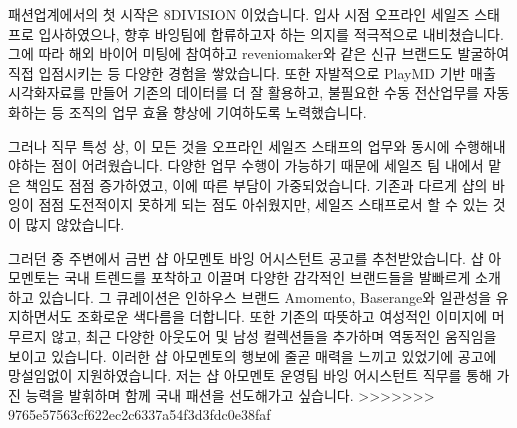 \documentclass[a4paper,10pt]{extarticle}
\begin{document}
패션업계에서의 첫 시작은 8DIVISION 이었습니다. 입사 시점 오프라인 세일즈 스태프로 입사하였으나, 향후 바잉팀에 합류하고자 하는 의지를 적극적으로 내비쳤습니다. 그에 따라 해외 바이어 미팅에 참여하고 reveniomaker와 같은 신규 브랜드도 발굴하여 직접 입점시키는 등 다양한 경험을 쌓았습니다. 또한 자발적으로 PlayMD 기반 매출 시각화자료를 만들어 기존의 데이터를 더 잘 활용하고, 불필요한 수동 전산업무를 자동화하는 등 조직의 업무 효율 향상에 기여하도록 노력했습니다.

그러나 직무 특성 상, 이 모든 것을 오프라인 세일즈 스태프의 업무와 동시에 수행해내야하는 점이 어려웠습니다. 다양한 업무 수행이 가능하기 때문에 세일즈 팀 내에서 맡은 책임도 점점 증가하였고, 이에 따른 부담이 가중되었습니다. 기존과 다르게 샵의 바잉이 점점 도전적이지 못하게 되는 점도 아쉬웠지만, 세일즈 스태프로서 할 수 있는 것이 많지 않았습니다.

그러던 중 주변에서 금번 샵 아모멘토 바잉 어시스턴트 공고를 추천받았습니다. 샵 아모멘토는 국내 트렌드를 포착하고 이끌며 다양한 감각적인 브랜드들을 발빠르게 소개하고 있습니다. 그 큐레이션은 인하우스 브랜드 Amomento, Baserange와 일관성을 유지하면서도 조화로운 색다름을 더합니다. 또한 기존의 따뜻하고 여성적인 이미지에 머무르지 않고, 최근 다양한 아웃도어 및 남성 컬렉션들을 추가하며 역동적인 움직임을 보이고 있습니다. 이러한 샵 아모멘토의 행보에 줄곧 매력을 느끼고 있었기에 공고에 망설임없이 지원하였습니다. 저는 샵 아모멘토 운영팀 바잉 어시스턴트 직무를 통해 가진 능력을 발휘하며 함께 국내 패션을 선도해가고 싶습니다.
>>>>>>> 9765e57563cf622ec2c6337a54f3d3fdc0e38faf
\end{document}
